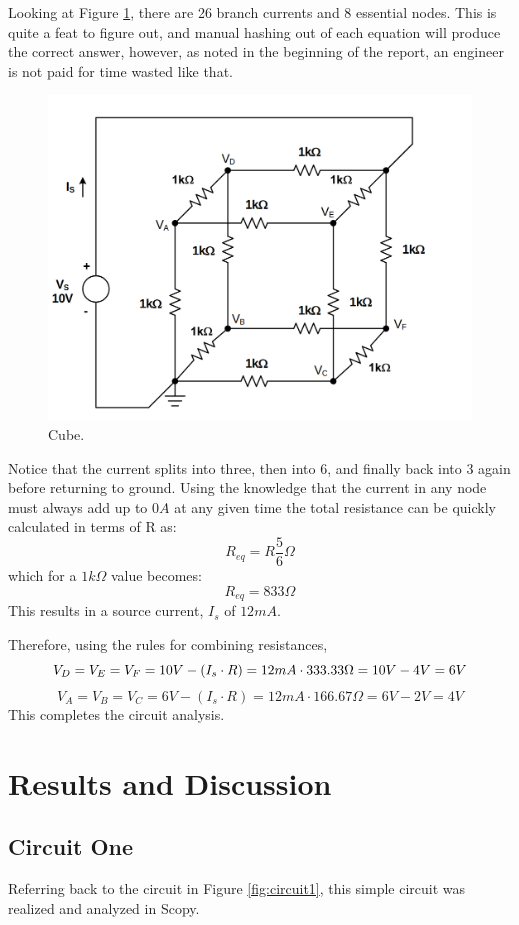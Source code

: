 \documentclass[12pt]{article}
\begin{document}
Looking at Figure \ref{fig:circuit3}, there are 26 branch currents and 8
essential nodes. This is quite a feat to figure out, and manual hashing out of
each equation will produce the correct answer, however, as noted in the
beginning of the report, an engineer is not paid for time wasted like that.

\begin{figure}[H]
	\centering
	\includegraphics[width=\textwidth]{06_03}
	\caption{Cube.}
	\label{fig:circuit3}
\end{figure}
Notice that the current splits into three, then into 6, and finally back into 3
again before returning to ground. Using the knowledge that the current in any
node must always add up to $0A$ at any given time the total resistance can be
quickly calculated in terms of R as:
\[R_{eq} = R\frac{5}{6}\Omega\] which for a $1k\Omega$ value becomes:
\[
	R_{eq} = 833\Omega
\]
This results in a source current, $I_s$ of $12mA$.

Therefore, using the rules for combining resistances,
\[
	V_D = V_E = V_F = 10V - (I_s \cdot R) = 12mA \cdot 333.33\Omega = 10V - 4V = 6V\\
\]
\[
	V_A = V_B = V_C = 6V - (I_s \cdot R) = 12mA \cdot 166.67\Omega = 6V - 2V = 4V
\]
This completes the circuit analysis.
\section{Results and Discussion}
\subsection{Circuit One}
Referring back to the circuit in Figure \ref{fig:circuit1}, this simple circuit was realized
and analyzed in Scopy.
\end{document}
